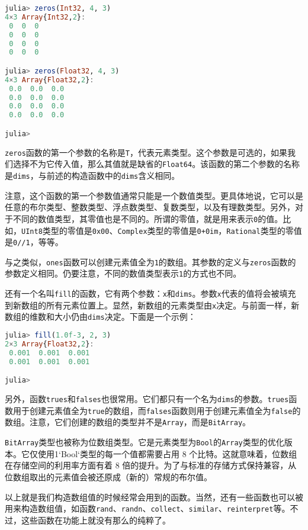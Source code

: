 \begin{lstlisting}[language=julia]
julia> zeros(Int32, 4, 3)
4×3 Array{Int32,2}:
 0  0  0
 0  0  0
 0  0  0
 0  0  0

julia> zeros(Float32, 4, 3)
4×3 Array{Float32,2}:
 0.0  0.0  0.0
 0.0  0.0  0.0
 0.0  0.0  0.0
 0.0  0.0  0.0

julia> 
\end{lstlisting}

\verb`zeros`函数的第一个参数的名称是\verb`T`，代表元素类型。这个参数是可选的，如果我们选择不为它传入值，那么其值就是缺省的\verb`Float64`。该函数的第二个参数的名称是\verb`dims`，与前述的构造函数中的\verb`dims`含义相同。

注意，这个函数的第一个参数值通常只能是一个数值类型。更具体地说，它可以是任意的布尔类型、整数类型、浮点数类型、复数类型，以及有理数类型。另外，对于不同的数值类型，其零值也是不同的。所谓的零值，就是用来表示\verb`0`的值。比如，\verb`UInt8`类型的零值是\verb`0x00`、\verb`Complex`类型的零值是\verb`0+0im`，\verb`Rational`类型的零值是\verb`0//1`，等等。

与之类似，\verb`ones`函数可以创建元素值全为\verb`1`的数组。其参数的定义与\verb`zeros`函数的参数定义相同。仍要注意，不同的数值类型表示\verb`1`的方式也不同。

还有一个名叫\verb`fill`的函数，它有两个参数：\verb`x`和\verb`dims`。参数\verb`x`代表的值将会被填充到新数组的所有元素位置上。显然，新数组的元素类型由\verb`x`决定。与前面一样，新数组的维数和大小仍由\verb`dims`决定。下面是一个示例：

\begin{lstlisting}[language=julia]
julia> fill(1.0f-3, 2, 3)
2×3 Array{Float32,2}:
 0.001  0.001  0.001
 0.001  0.001  0.001

julia> 
\end{lstlisting}

另外，函数\verb`trues`和\verb`falses`也很常用。它们都只有一个名为\verb`dims`的参数。\verb`trues`函数用于创建元素值全为\verb`true`的数组，而\verb`falses`函数则用于创建元素值全为\verb`false`的数组。注意，它们创建的数组的类型并不是\verb`Array`，而是\verb`BitArray`。

\verb`BitArray`类型也被称为位数组类型。它是元素类型为\verb`Bool`的\verb`Array`类型的优化版本。它仅使用1`Bool`类型的每一个值都需要占用 8 个比特。这就意味着，位数组在存储空间的利用率方面有着 8 倍的提升。为了与标准的存储方式保持兼容，从位数组取出的元素值会被还原成（新的）常规的布尔值。

以上就是我们构造数组值的时候经常会用到的函数。当然，还有一些函数也可以被用来构造数组值，如函数\verb`rand`、\verb`randn`、\verb`collect`、\verb`similar`、\verb`reinterpret`等。不过，这些函数在功能上就没有那么的纯粹了。
